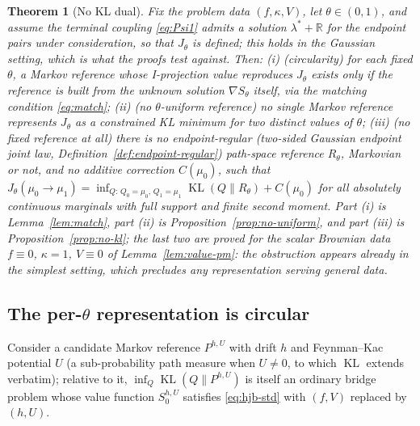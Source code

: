 \documentclass[letterpaper,10pt,conference]{IEEEtran}
\newtheorem{theorem}{Theorem}
\newcommand{\KL}{\operatorname{KL}}
\newcommand{\RR}{\mathbb{R}}
\begin{document}
	\begin{theorem}[No KL dual]
		\label{thm:flagship}
		Fix the problem data $(f,\kappa,V)$, let $\theta\in(0,1)$, and assume the
		terminal coupling \eqref{eq:Psi1} admits a solution $\lambda^*+\RR$ for the
		endpoint pairs under consideration, so that $J_\theta$ is defined; this
		holds in the Gaussian setting, which is what the proofs test against.
		Then:
		(i) {(circularity)} for each fixed $\theta$, a Markov reference whose
		I-projection value reproduces $J_\theta$ exists only if the reference is
		built from the unknown solution $\nabla S_\theta$ itself, via the matching
		condition \eqref{eq:match};
		(ii) {(no $\theta$-uniform reference)} no single Markov reference
		represents $J_\theta$ as a constrained KL minimum for two distinct values
		of $\theta$;
		(iii) {(no fixed reference at all)} there is no endpoint-regular
		(two-sided Gaussian endpoint joint law, Definition~\ref{def:endpoint-regular})
		path-space reference $R_\theta$, Markovian or not, and no additive
		correction $C(\mu_0)$, such that
		$J_\theta(\mu_0\to\mu_1)=\inf_{Q:\,Q_0=\mu_0,\,Q_1=\mu_1}\KL(Q\|R_\theta)+C(\mu_0)$
		for all absolutely continuous marginals with full support and finite second
		moment. Part (i) is Lemma~\ref{lem:match}, part (ii) is
		Proposition~\ref{prop:no-uniform}, and part (iii) is
		Proposition~\ref{prop:no-kl}; the last two are proved for the scalar
		Brownian data $f\equiv0$, $\kappa=1$, $V\equiv0$ of
		Lemma~\ref{lem:value-pm}: the obstruction appears already in the simplest
		setting, which precludes any representation serving general data.
	\end{theorem}
	
	\subsection{The per-$\theta$ representation is circular}
	Consider a candidate Markov reference $P^{h,U}$ with drift $h$ and
	Feynman--Kac potential $U$ (a sub-probability path measure when $U\neq0$, to
	which $\KL$ extends verbatim); relative to it, $\inf_Q\KL(Q\|P^{h,U})$ is itself
	an ordinary bridge problem whose value function $S_0^{h,U}$ satisfies
	\eqref{eq:hjb-std} with $(f,V)$ replaced by $(h,U)$.
	
\end{document}
